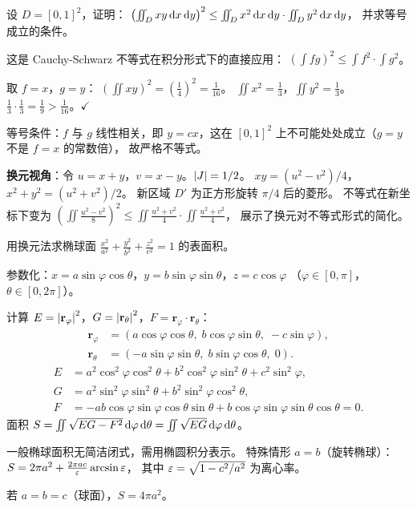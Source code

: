 \documentclass{ctexart}
\begin{document}
\begin{exercise}
  设 $D = [0,1]^2$，证明：
  $\left(\iint_D xy\,\mathrm{d} x\,\mathrm{d} y\right)^2
  \le \iint_D x^2\,\mathrm{d} x\,\mathrm{d} y \cdot \iint_D y^2\,\mathrm{d} x\,\mathrm{d} y$，
  并求等号成立的条件。
\end{exercise}

\begin{solution}
  这是 Cauchy-Schwarz 不等式在积分形式下的直接应用：
  $\left(\int fg\right)^2 \le \int f^2 \cdot \int g^2$。

  取 $f = x$，$g = y$：
  $\left(\iint xy\right)^2 = \left(\frac{1}{4}\right)^2 = \frac{1}{16}$。
  $\iint x^2 = \frac{1}{3}$，$\iint y^2 = \frac{1}{3}$。
  $\frac{1}{3}\cdot\frac{1}{3} = \frac{1}{9} > \frac{1}{16}$。$\checkmark$

  等号条件：$f$ 与 $g$ 线性相关，即 $y = cx$，这在 $[0,1]^2$ 上不可能处处成立（$g = y$ 不是 $f = x$ 的常数倍），
  故严格不等式。

  \textbf{换元视角}：令 $u = x+y$，$v = x-y$。$\left| J \right| = 1/2$。
  $xy = (u^2-v^2)/4$，$x^2+y^2 = (u^2+v^2)/2$。
  新区域 $D'$ 为正方形旋转 $\pi/4$ 后的菱形。
  不等式在新坐标下变为 $\left(\iint \frac{u^2-v^2}{8}\right)^2
  \le \iint\frac{u^2+v^2}{4}\cdot\iint\frac{u^2+v^2}{4}$，
  展示了换元对不等式形式的简化。
\end{solution}

\begin{exercise}
  用换元法求椭球面 $\frac{x^2}{a^2}+\frac{y^2}{b^2}+\frac{z^2}{c^2} = 1$
  的表面积。
\end{exercise}

\begin{solution}
  参数化：$x = a\sin\varphi\cos\theta$，$y = b\sin\varphi\sin\theta$，$z = c\cos\varphi$
  （$\varphi \in [0,\pi]$，$\theta \in [0,2\pi]$）。

  计算 $E = \left| \mathbf{r}_\varphi \right|^2$，$G = \left| \mathbf{r}_\theta \right|^2$，$F = \mathbf{r}_\varphi\cdot\mathbf{r}_\theta$：
  \begin{align*}
    \mathbf{r}_\varphi &= (a\cos\varphi\cos\theta,\; b\cos\varphi\sin\theta,\; -c\sin\varphi), \\
    \mathbf{r}_\theta &= (-a\sin\varphi\sin\theta,\; b\sin\varphi\cos\theta,\; 0).
  \end{align*}
  \begin{align*}
    E &= a^2\cos^2\varphi\cos^2\theta + b^2\cos^2\varphi\sin^2\theta + c^2\sin^2\varphi, \\
    G &= a^2\sin^2\varphi\sin^2\theta + b^2\sin^2\varphi\cos^2\theta, \\
    F &= -ab\cos\varphi\sin\varphi\cos\theta\sin\theta + b\cos\varphi\sin\varphi\sin\theta\cos\theta = 0.
  \end{align*}
  面积 $S = \iint \sqrt{EG - F^2}\,\mathrm{d}\varphi\,\mathrm{d}\theta = \iint \sqrt{EG}\,\mathrm{d}\varphi\,\mathrm{d}\theta$。

  一般椭球面积无简洁闭式，需用椭圆积分表示。
  特殊情形 $a = b$（旋转椭球）：
  $S = 2\pi a^2 + \frac{2\pi ac}{\varepsilon}\arcsin\varepsilon$，
  其中 $\varepsilon = \sqrt{1-c^2/a^2}$ 为离心率。

  若 $a = b = c$（球面），$S = 4\pi a^2$。
\end{solution}
\end{document}
